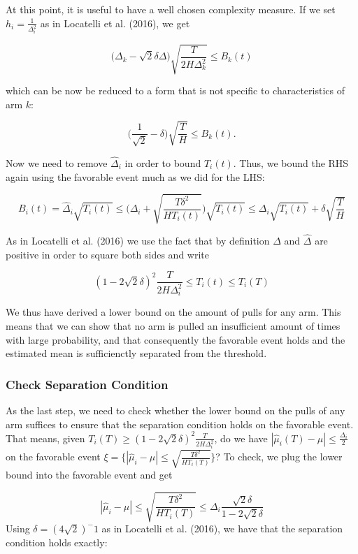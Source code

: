 \documentclass[11pt,]{article}
\begin{document}
At this point, it is useful to have a well chosen complexity measure. If
we set \(h_i = \frac{1}{\Delta_i^2}\) as in Locatelli et al. (2016), we
get

\[
\Big(\Delta_k - \sqrt{2}\delta \Delta \Big) \sqrt{\frac{T}{2H\Delta_k^2}} \leq B_k(t)
\]

which can be now be reduced to a form that is not specific to
characteristics of arm \(k\):

\[
\Big( \frac{1}{\sqrt{2}} - \delta \Big) \sqrt{\frac{T}{H}} \leq B_k(t).
\]

Now we need to remove \(\hat{\Delta}_i\) in order to bound \(T_i(t)\).
Thus, we bound the RHS again using the favorable event much as we did
for the LHS:

\[
B_i(t) = \hat{\Delta}_i \sqrt{T_i(t)} \leq \Big(\Delta_i + \sqrt{\frac{T\delta^2}{HT_i(t)}}\Big) \sqrt{T_i(t)} \leq \Delta_i \sqrt{T_i(t)} + \delta \sqrt{\frac{T}{H}}
\]

As in Locatelli et al. (2016) we use the fact that by definition
\(\Delta\) and \(\hat{\Delta}\) are positive in order to square both
sides and write

\[
(1 - 2\sqrt{2}\delta)^2 \frac{T}{2H\Delta^2_i} \leq T_i(t) \leq T_i(T)
\]

We thus have derived a lower bound on the amount of pulls for any arm.
This means that we can show that no arm is pulled an insufficient amount
of times with large probability, and that consequently the favorable
event holds and the estimated mean is sufficienctly separated from the
threshold.

\subsubsection{\texorpdfstring{Check Separation Condition
\label{sec:CheckSeparationCondition}}{Check Separation Condition }}\label{check-separation-condition}

As the last step, we need to check whether the lower bound on the pulls
of any arm suffices to ensure that the separation condition holds on the
favorable event. That means, given
\(T_i(T) \geq (1-2\sqrt{2}\delta)^2 \frac{T}{2H\Delta_i^2}\), do we have
\(|\hat{\mu}_i(T) - \mu | \leq \frac{\Delta_i}{2}\) on the favorable
event
\(\xi = \Big\{|\hat{\mu}_i - \mu | \leq \sqrt{\frac{T\delta^2}{H T_i(T)}}\Big\}\)?
To check, we plug the lower bound into the favorable event and get

\[
|\hat{\mu}_i - \mu | \leq \sqrt{\frac{T\delta^2}{H T_i(T)}} \leq \Delta_i \frac{\sqrt{2}\delta}{1-2\sqrt{2}\delta}
\] Using \(\delta = (4\sqrt{2})^-1\) as in Locatelli et al. (2016), we
have that the separation condition holds exactly:
\end{document}
